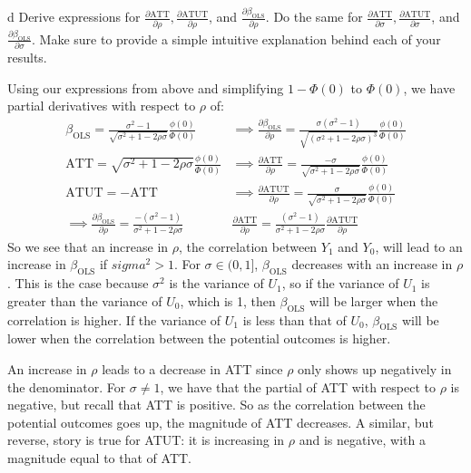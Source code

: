 \documentclass{article}
\begin{document}
\begin{problem}{d}
Derive expressions for $\frac{\partial \text{ATT}}{\partial \rho}, \frac{\partial \text{ATUT}}{\partial \rho}$, and $\frac{\partial \beta_\text{OLS}}{\partial \rho}$. Do the same for $\frac{\partial \text{ATT}}{\partial \sigma}, \frac{\partial \text{ATUT}}{\partial \sigma}$, and $\frac{\partial \beta_\text{OLS}}{\partial \sigma}$. Make sure to provide a simple intuitive explanation behind each of your results.
\end{problem}
\begin{solution}
Using our expressions from above and simplifying $1-\Phi(0)$ to $\Phi(0)$, we have partial derivatives with respect to $\rho$ of:
\begin{align*}
    \beta_\text{OLS} =  \frac{\sigma^2-1}{\sqrt{\sigma^2+1-2\rho\sigma}} \frac{\phi(0)}{\Phi(0)} &\implies \frac{\partial \beta_\text{OLS}}{\partial \rho} = \frac{\sigma(\sigma^2-1)}{\sqrt{(\sigma^2+1-2\rho\sigma)^3}} \frac{\phi(0)}{\Phi(0)} 
    \\
    \text{ATT} = \sqrt{\sigma^2 + 1 - 2\rho\sigma} \frac{\phi(0)}{\Phi(0)} &\implies \frac{\partial \text{ATT}}{\partial \rho} = \frac{-\sigma}{\sqrt{\sigma^2 + 1 - 2\rho\sigma}} \frac{\phi(0)}{\Phi(0)} \\
    \text{ATUT} = -\text{ATT} &\implies \frac{\partial \text{ATUT}}{\partial \rho} = \frac{\sigma}{\sqrt{\sigma^2 + 1 - 2\rho\sigma}} \frac{\phi(0)}{\Phi(0)}
    \\
    \implies \frac{\partial{\beta_\text{OLS}}}{\partial \rho}= \frac{-(\sigma^2-1)}{\sigma^2 + 1 - 2\rho\sigma} & \frac{\partial \text{ATT}}{\partial \rho} = \frac{(\sigma^2-1)}{\sigma^2 + 1 - 2\rho\sigma} \frac{\partial \text{ATUT}}{\partial \rho}
\end{align*}
So we see that an increase in $\rho$, the correlation between $Y_1$ and $Y_0$, will lead to an increase in $\beta_\text{OLS}$ if $sigma^2>1$. For $\sigma \in (0,1]$, $\beta_\text{OLS}$ decreases with an increase in $\rho$. This is the case because $\sigma^2$ is the variance of $U_1$, so if the variance of $U_1$ is greater than the variance of $U_0$, which is 1, then $\beta_\text{OLS}$ will be larger when the correlation is higher. If the variance of $U_1$ is less than that of $U_0$, $\beta_\text{OLS}$ will be lower when the correlation between the potential outcomes is higher. 

An increase in $\rho$ leads to a decrease in ATT since $\rho$ only shows up negatively in the denominator. For $\sigma\neq1$, we have that the partial of ATT with respect to $\rho$ is negative, but recall that ATT is positive. So as the correlation between the potential outcomes goes up, the magnitude of ATT decreases. A similar, but reverse, story is true for ATUT: it is increasing in $\rho$ and is negative, with a magnitude equal to that of ATT. 


\end{solution}
\end{document}
